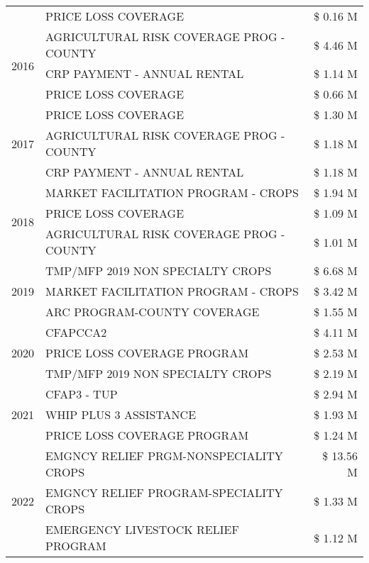 \begin{tabular}{llr}
 & PRICE LOSS COVERAGE & \$ 0.16 M \\
\cline{1-3}
\multirow[t]{3}{*}{2016} & AGRICULTURAL RISK COVERAGE PROG - COUNTY & \$ 4.46 M \\
 & CRP PAYMENT - ANNUAL RENTAL & \$ 1.14 M \\
 & PRICE LOSS COVERAGE & \$ 0.66 M \\
\cline{1-3}
\multirow[t]{3}{*}{2017} & PRICE LOSS COVERAGE & \$ 1.30 M \\
 & AGRICULTURAL RISK COVERAGE PROG - COUNTY & \$ 1.18 M \\
 & CRP PAYMENT - ANNUAL RENTAL & \$ 1.18 M \\
\cline{1-3}
\multirow[t]{3}{*}{2018} & MARKET FACILITATION PROGRAM - CROPS & \$ 1.94 M \\
 & PRICE LOSS COVERAGE & \$ 1.09 M \\
 & AGRICULTURAL RISK COVERAGE PROG - COUNTY & \$ 1.01 M \\
\cline{1-3}
\multirow[t]{3}{*}{2019} & TMP/MFP 2019 NON SPECIALTY CROPS & \$ 6.68 M \\
 & MARKET FACILITATION PROGRAM - CROPS & \$ 3.42 M \\
 & ARC PROGRAM-COUNTY COVERAGE & \$ 1.55 M \\
\cline{1-3}
\multirow[t]{3}{*}{2020} & CFAPCCA2 & \$ 4.11 M \\
 & PRICE LOSS COVERAGE PROGRAM & \$ 2.53 M \\
 & TMP/MFP 2019 NON SPECIALTY CROPS & \$ 2.19 M \\
\cline{1-3}
\multirow[t]{3}{*}{2021} & CFAP3 - TUP & \$ 2.94 M \\
 & WHIP PLUS 3 ASSISTANCE & \$ 1.93 M \\
 & PRICE LOSS COVERAGE PROGRAM & \$ 1.24 M \\
\cline{1-3}
\multirow[t]{3}{*}{2022} & EMGNCY RELIEF PRGM-NONSPECIALITY CROPS & \$ 13.56 M \\
 & EMGNCY RELIEF PROGRAM-SPECIALITY CROPS & \$ 1.33 M \\
 & EMERGENCY LIVESTOCK RELIEF PROGRAM & \$ 1.12 M \\
\cline{1-3}
\bottomrule
\end{tabular}
